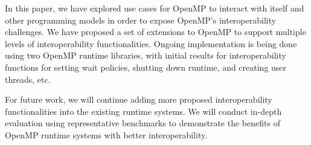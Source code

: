 In this paper, we have explored use cases for OpenMP to interact with itself and other programming models
in order to expose OpenMP's interoperability challenges. 
We have proposed a set of extensions to OpenMP to support multiple levels of interoperability functionalities. 
Ongoing implementation is being done using two OpenMP runtime libraries, with initial results for 
interoperability functions for setting wait policies, shutting down runtime, and creating user threads, etc. 
\begin{comment}
One feature is 
that allowing the user to create a new OpenMP thread and assign a task to it instead 
of creating new user thread. We have implement a function to allow users to get one 
thread from the existing thread pool is any threads are available, and assign one task 
to this thread, this helps to take advantage of the OpenMP thread pool and won’t need 
to create a new thread to work on it, which helps to save the memory usage and speed up the runtime.

We have studied the waiting policy of the OpenMP and how the current OpenMP Runtime System deals with the thread pool. Considering there are two waiting policies, one called throughput (passive), which is designed to make the program aware of its environment (that is, the system load) and to adjust its resource usage to produce efficient execution in a dynamic environment. While the other one called turnaround (active), which is designed to keep active all of the processors involved in the parallel computation in order to minimize the execution time of a single job. We cannot simply say which one is better than the other, it depends one the executing environment. When setting the wait policy to be passive, after a certain period of time has elapsed, the useless thread will stop waiting and sleep. Thus active mode may be better for high-density of OpenMP tasks. While, a passive mode with a small blocktime value may offer better overall performance if your application contains non-OpenMP threaded code that executes between parallel regions. 

In addition, we have implemented a new function to shutdown the whole runtime library when exiting the parallel region. Since all threads are maintained in the same thread pool, quiesce will reap every threads to free the memory, which sometimes help to clear the runtime environment when the task density is lower and we don’t need to wake up most of the thread in the thread pool. However, when entering new parallel regions, we need to make sure that we register the current working thread as our root thread, so that new runtime environment can be built on it. It cost time to restart another parallel region, thus works slower when lots of tasks in the task queue.
\end{comment}

For future work, we will continue adding more proposed interoperability functionalities into the existing runtime systems. We will conduct in-depth evaluation using representative benchmarks to demonstrate the benefits of OpenMP runtime systems with better interoperability. 

